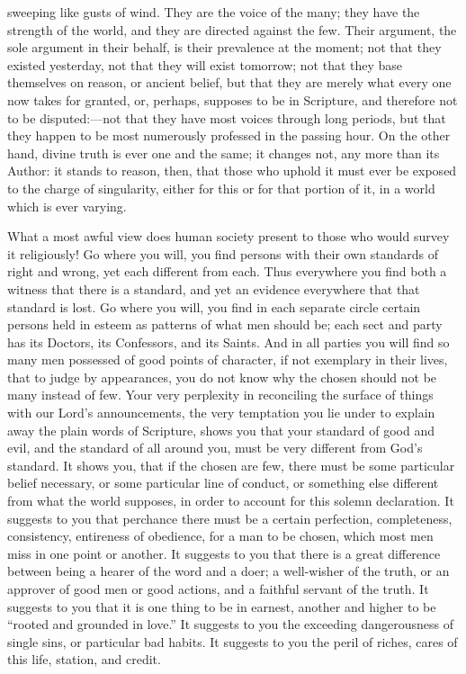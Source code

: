 sweeping like gusts of wind. They are the voice of the many; they have
the strength of the world, and they are directed against the few.
Their argument, the sole argument in their behalf, is their prevalence
at the moment; not that they existed yesterday, not that they will
exist tomorrow; not that they base themselves on reason, or ancient
belief, but that they are merely what every one now takes for granted,
or, perhaps, supposes to be in Scripture, and therefore not to be
disputed:—not that they have most voices through long periods, but
that they happen to be most numerously professed in the passing hour.
On the other hand, divine truth is ever one and the same; it changes
not, any more than its Author: it stands to reason, then, that those
who uphold it must ever be exposed to the charge of singularity,
either for this or for that portion of it, in a world which is ever
varying.

What a most awful view does human society present to those who
would survey it religiously! Go where you will, you find persons with
their own standards of right and wrong, yet each different from each.
Thus everywhere you find both a witness that there is a standard, and
yet an evidence everywhere that that standard is lost. Go where you
will, you find in each separate circle certain persons held in esteem
as patterns of what men should be; each sect and party has its
Doctors, its Confessors, and its Saints. And in all parties you will
find so many men possessed of good points of character, if not
exemplary in their lives, that to judge by appearances, you do not
know why the chosen should not be many instead of few. Your very
perplexity in reconciling the surface of things with our Lord's
announcements, the very temptation you lie under to explain away the
plain words of Scripture, shows you that your standard of good and
evil, and the standard of all around you, must be very different from
God's standard. It shows you, that if the chosen are few, there must
be some particular belief necessary, or some particular line of
conduct, or something else different from what the world supposes, in
order to account for this solemn declaration. It suggests to you that
perchance there must be a certain perfection, completeness,
consistency, entireness of obedience, for a man to be chosen, which
most men miss in one point or another. It suggests to you that there
is a great difference between being a hearer of the word and a doer; a
well-wisher of the truth, or an approver of good men or good actions,
and a faithful servant of the truth. It suggests to you that it is one
thing to be in earnest, another and higher to be ``rooted and
grounded in love.'' It suggests to you the exceeding dangerousness
of single sins, or particular bad habits. It suggests to you the peril
of riches, cares of this life, station, and credit.

